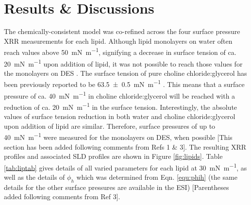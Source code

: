 \documentclass[amsmath,amssymb,twocolumn,superscriptaddress]{revtex4-1}
\begin{document}
\section{Results \& Discussions}
%
The chemically-consistent model was co-refined across the four surface pressure XRR measurements for each lipid.
Although lipid monolayers on water often reach values above \SI{50}{\milli\newton\per\meter}, signifying a decrease in surface tension of ca. \SI{20}{\milli\newton\per\meter} upon addition of lipid, it was not possible to reach those values for the monolayers on DES \cite{mohwald_phospholipid_1990}.
The surface tension of pure choline chloride:glycerol has been previously reported to be \SI{63.5\pm0.5}{\milli\newton\per\meter} \cite{sanchez-fernandez_micellization_2016}.
This means that a surface pressure of ca. \SI{40}{\milli\newton\per\meter} in choline chloride:glycerol will be reached with a reduction of ca. \SI{20}{\milli\newton\per\meter} in the surface tension.
Interestingly, the absolute values of surface tension reduction in both water and choline chloride:glycerol upon addition of lipid are similar.
Therefore, surface pressures of up to \SI{40}{\milli\newton\per\meter} were measured for the monolayers on DES, when possible [This section has been added following comments from Refs 1 \& 3].
The resulting XRR profiles and associated SLD profiles are shown in Figure \ref{fig:lipids}.
Table \ref{tab:liptab} gives details of all varied parameters for each lipid at \SI{30}{\milli\newton\per\meter}, as well as the details of $\phi_h$ which was determined from Eqn. \ref{equ:phih} (the same details for the other surface pressures are available in the ESI) [Parentheses added following comments from Ref 3].
%
\end{document}
